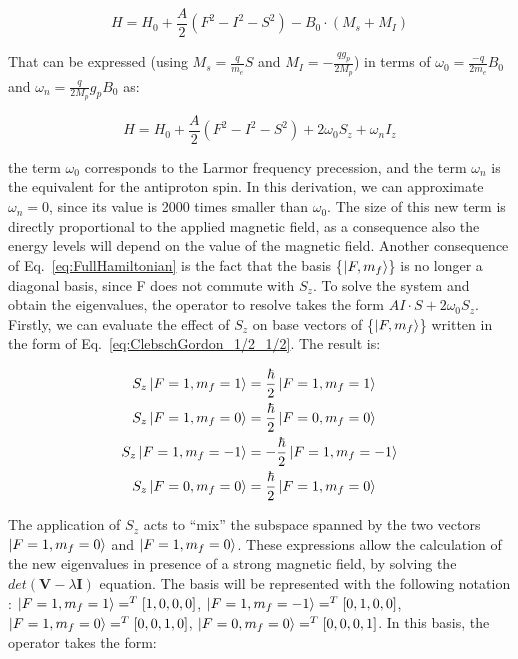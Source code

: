 \begin{equation}
H = H_{0} + \frac{A}{2} (F^2 - I^2 - S^2) - B_{0} \cdot (M_{s} + M_{I})
\end{equation}

That can be expressed (using $M_{s} = \frac{q}{m_{e}} S$ and $M_{I} = - \frac{q g_{p}}{2 M_{p}}$) in terms of $\omega_{0} = \frac{-q}{2 m_{e}} B_{0}$ and $\omega_{n} = \frac{q}{2M_{p}} g_{p} B_{0}$ as:

\begin{equation} \label{eq:FullHamiltonian}
H = H_{0} + \frac{A}{2} (F^2 - I^2 - S^2) + 2 \omega_{0} S_{z} + \omega_{n} I_{z}
\end{equation}

the term $ \omega_{0}$ corresponds to the Larmor frequency precession, and the term $\omega_{n}$ is the equivalent for the antiproton spin. In this derivation, we can approximate $\omega_{n} = 0$, since its value is 2000 times smaller than $\omega_{0}$. The size of this new term is directly proportional to the applied magnetic field, as a consequence also the energy levels will depend on the value of the magnetic field. Another consequence of Eq.~\ref{eq:FullHamiltonian} is the fact that the basis \{$\ket{F,m_{f}}$\} is no longer a diagonal basis, since F does not commute with $S_{z}$. To solve the system and obtain the eigenvalues, the operator to resolve takes the form $A I \cdot S + 2 \omega_{0} S_{z}$. Firstly, we can evaluate the effect of $S_{z}$ on base vectors of \{$\ket{F,m_f}$\} written in the form of Eq.~\ref{eq:ClebschGordon_1/2_1/2}. The result is: 

\begin{align}
S_z \ket{F=1,m_f = 1}  &= \frac{\hbar}{2} \ket{F = 1, m_f =  1} \\
S_z \ket{F=1,m_f = 0}  &= \frac{\hbar}{2} \ket{F = 0, m_f =  0} \\
S_z \ket{F=1,m_f = -1} &= -\frac{\hbar}{2} \ket{F = 1, m_f =  -1} \\
S_z \ket{F=0,m_f = 0}  &= \frac{\hbar}{2} \ket{F = 1, m_f =  0} \\
\end{align}

The application of $S_{z}$ acts to ``mix'' the subspace spanned by the two vectors $\ket{F=1,m_f = 0}$ and $\ket{F = 1, m_f =  0}$. These expressions allow the calculation of the new eigenvalues in presence of a strong magnetic field, by solving the $det(\mathbf{V} - \lambda \mathbf{I})$ equation. The basis will be represented with the following notation : $\ket{F = 1, m_f = 1 } = ^T[1,0,0,0]$, $\ket{F = 1, m_f = -1 } = ^T[0,1,0,0]$, $\ket{F = 1, m_f = 0 } = ^T[0,0,1,0]$, $\ket{F = 0, m_f = 0 } = ^T[0,0,0,1]$. In this basis, the operator takes the form:


